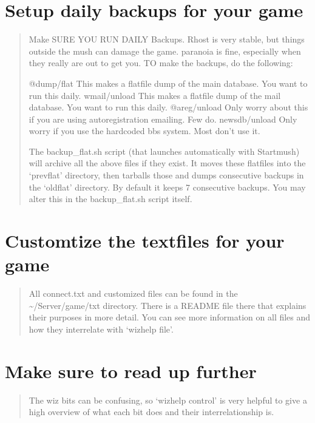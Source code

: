 \documentclass[letterpaper,10pt,english]{sphinxmanual}
\begin{document}
\section{Setup daily backups for your game}
\label{\detokenize{24-quickinstall:setup-daily-backups-for-your-game}}\begin{quote}

\sphinxAtStartPar
Make SURE YOU RUN DAILY Backups.  Rhost is very stable, but things outside the mush can damage the game.
paranoia is fine, especially when they really are out to get you.  TO make the backups, do the following:

\sphinxAtStartPar
@dump/flat      \textendash{} This makes a flatfile dump of the main database.  You want to run this daily.
wmail/unload    \textendash{} This makes a flatfile dump of the mail database.  You want to run this daily.
@areg/unload    \textendash{} Only worry about this if you are using auto\sphinxhyphen{}registration emailing.  Few do.
newsdb/unload   \textendash{} Only worry if you use the hardcoded bbs system.  Most don’t use it.

\sphinxAtStartPar
The backup\_flat.sh script (that launches automatically with Startmush) will archive all the above files
if they exist.  It moves these flatfiles into the ‘prevflat’ directory, then tarballs those and dumps
consecutive backups in the ‘oldflat’ directory.  By default it keeps 7 consecutive backups.  You may
alter this in the backup\_flat.sh script itself.
\end{quote}


\section{Customtize the textfiles for your game}
\label{\detokenize{24-quickinstall:customtize-the-textfiles-for-your-game}}\begin{quote}

\sphinxAtStartPar
All connect.txt and customized files can be found in the \textasciitilde{}/Server/game/txt directory.  There is a
README file there that explains their purposes in more detail.  You can see more information on
all files and how they inter\sphinxhyphen{}relate with ‘wizhelp file’.
\end{quote}


\section{Make sure to read up further}
\label{\detokenize{24-quickinstall:make-sure-to-read-up-further}}\begin{quote}

\sphinxAtStartPar
The wiz bits can be confusing, so ‘wizhelp control’ is very helpful to give a high overview
of what each bit does and their inter\sphinxhyphen{}relationship is.
\end{quote}
\end{document}
